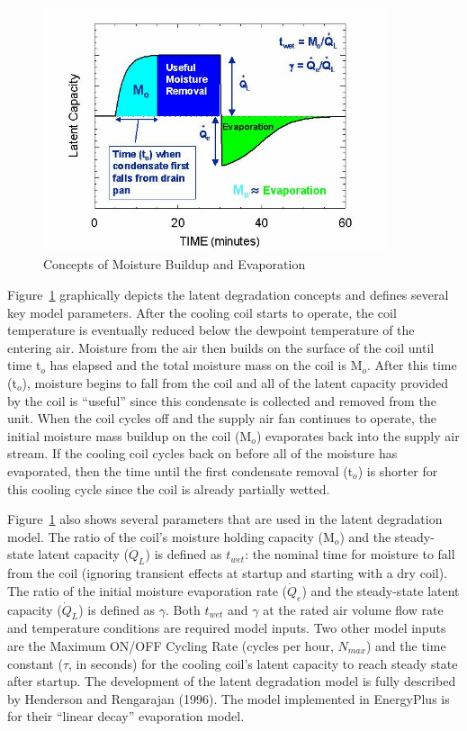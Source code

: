 \begin{figure}[hbtp] %
\centering
\includegraphics[width=0.9\textwidth, height=0.9\textheight, keepaspectratio=true]{media/image3486.png}
\caption{Concepts of Moisture Buildup and Evaporation \protect \label{fig:concepts-of-moisture-buildup-and-evaporation}}
\end{figure}

Figure~\ref{fig:concepts-of-moisture-buildup-and-evaporation} graphically depicts the latent degradation concepts and defines several key model parameters. After the cooling coil starts to operate, the coil temperature is eventually reduced below the dewpoint temperature of the entering air. Moisture from the air then builds on the surface of the coil until time t\(_{o}\) has elapsed and the total moisture mass on the coil is M\(_{o}\). After this time (t\(_{o}\)), moisture begins to fall from the coil and all of the latent capacity provided by the coil is ``useful'' since this condensate is collected and removed from the unit. When the coil cycles off and the supply air fan continues to operate, the initial moisture mass buildup on the coil (M\(_{o}\)) evaporates back into the supply air stream. If the cooling coil cycles back on before all of the moisture has evaporated, then the time until the first condensate removal (t\(_{o}\)) is shorter for this cooling cycle since the coil is already partially wetted.

Figure~\ref{fig:concepts-of-moisture-buildup-and-evaporation} also shows several parameters that are used in the latent degradation model. The ratio of the coil's moisture holding capacity (M\(_{o}\)) and the steady-state latent capacity (\({\dot{Q}_{L}}\)) is defined as \(t_{wet}\): the nominal time for moisture to fall from the coil (ignoring transient effects at startup and starting with a dry coil). The ratio of the initial moisture evaporation rate (\({\dot{Q}_{e}}\)) and the steady-state latent capacity (\({\dot{Q}_{L}}\)) is defined as \(\gamma\). Both \(t_{wet}\) and \(\gamma\) at the rated air volume flow rate and temperature conditions are required model inputs. Two other model inputs are the Maximum ON/OFF Cycling Rate (cycles per hour, \(N_{max}\)) and the time constant (\(\tau\), in seconds) for the cooling coil's latent capacity to reach steady state after startup. The development of the latent degradation model is fully described by Henderson and Rengarajan (1996). The model implemented in EnergyPlus is for their ``linear decay'' evaporation model.

